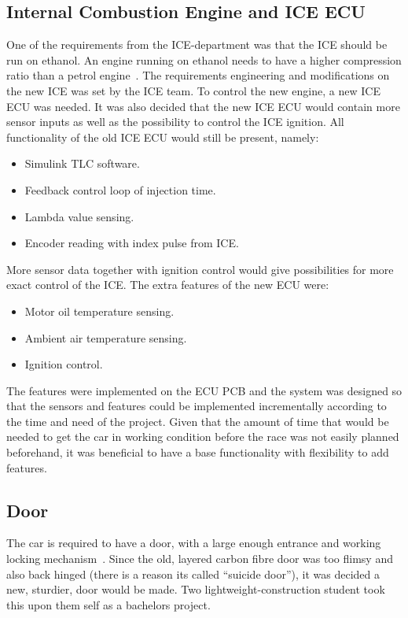 \subsection{Internal Combustion Engine and ICE ECU}
One of the requirements from the ICE-department was that the ICE should be run
on ethanol. An engine running on ethanol needs to have a higher compression ratio
than a petrol engine~\cite[p.8]{ICE_report}.
The requirements engineering and modifications on the new ICE was set by the ICE
team. To control the new engine, a new ICE ECU was needed. It was also decided
that the new ICE ECU would contain more sensor inputs as well as the possibility
to control the ICE ignition. All functionality of the old ICE ECU would still be
present, namely:
\begin{itemize}
    \item Simulink TLC software.
    \item Feedback control loop of injection time.
    \item Lambda value sensing.
    \item Encoder reading with index pulse from ICE\@.
\end{itemize}
More sensor data together with ignition control would give possibilities
for more exact control of the ICE\@. The extra features of the new ECU were:
\begin{itemize}
    \item Motor oil temperature sensing.
    \item Ambient air temperature sensing.
    \item Ignition control.
\end{itemize}
The features were implemented on the ECU PCB and the system was designed so that
the sensors and features could be implemented incrementally according to the
time and need of the project. Given that the amount of time that would be needed
to get the car in working condition before the race was not easily planned
beforehand, it was beneficial to have a base functionality with flexibility to
add features.

\subsection{Door}
The car is required to have a door, with a large enough entrance and working
locking mechanism~\cite{semrules16c1}. Since the old, layered carbon fibre door
was too flimsy and also back hinged (there is a reason its called ``suicide door''),
it was decided a new, sturdier, door would be made. Two lightweight-construction
student took this upon them self as a bachelors project. 

